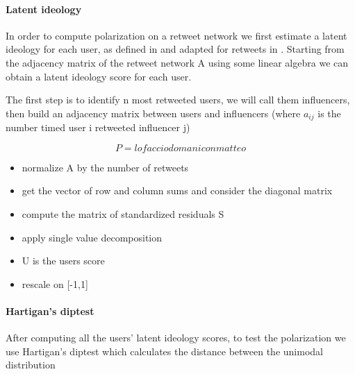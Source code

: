 \paragraph{Latent ideology}
In order to compute polarization on a retweet network we first estimate a latent ideology for each user, as defined in \cite{barbera_birds_2015} and adapted for retweets in \cite{flamino_shifting_2021}.
Starting from the adjacency matrix of the retweet network A  using some linear algebra we can obtain a latent ideology score for each user.

The first step is to identify n most retweeted users, we will call them influencers, then build an adjacency matrix between users and influencers (where \(a_{ij}\) is the number timed user i retweeted influencer j)

\[P = lo faccio domani con matteo\]



\begin{itemize}
    \item normalize A by the number of retweets 
    \item get the vector of row and column sums and consider the diagonal matrix 
    \item compute the matrix of standardized residuals S
    \item apply single value decomposition 
    \item U is the users score 
    \item rescale on [-1,1]

\end{itemize}



\paragraph{Hartigan's diptest}

After computing all the users' latent ideology scores, to test the polarization we use Hartigan's diptest \cite{hartigan_dip_1985} which calculates the distance between the unimodal distribution 


